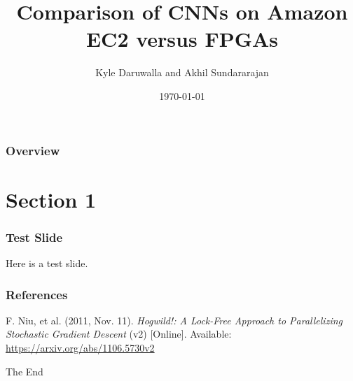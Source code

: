 \documentclass{beamer}
\title[ECE 901 Proposal Presentation]{Comparison of CNNs on Amazon EC2 versus FPGAs} %
\author{Kyle Daruwalla and Akhil Sundararajan}
\institute[UW-Madison]{ECE 901 Fall 2016}
\date{\today}
\begin{document}
\begin{frame}
	\titlepage
\end{frame}

\begin{frame}
	\frametitle{Overview}
	\tableofcontents
\end{frame}


\section{Section 1}
\begin{frame}
	\frametitle{Test Slide}
	Here is a test slide.
\end{frame}


\begin{frame}
	\frametitle{References}
	\footnotesize{
		\begin{thebibliography}{9} %
			F. Niu, et al. (2011, Nov. 11).
			\emph{Hogwild!: A Lock-Free Approach to Parallelizing Stochastic Gradient Descent} (v2) [Online].
			Available: \url{https://arxiv.org/abs/1106.5730v2}
		\end{thebibliography}
	}
\end{frame}


\begin{frame}
	\Huge{\centerline{The End}}
\end{frame}
\end{document}
